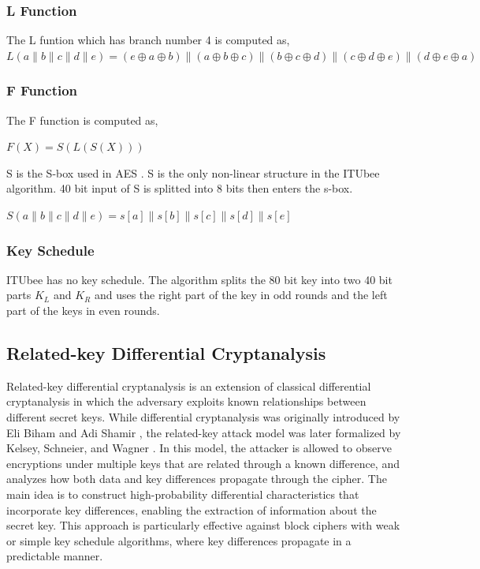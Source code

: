 \subsubsection{L Function}
The L funtion which has branch number 4 is computed as,\\
$L(a \parallel b \parallel c \parallel d \parallel e) = (e \oplus a \oplus b) \parallel (a \oplus b \oplus c) \parallel (b \oplus c \oplus d) \parallel (c \oplus d \oplus e) \parallel (d \oplus e \oplus a)$



\subsubsection{F Function}
The F function is computed as,\\
\begin{center}
    $F (X) = S(L(S(X)))$
\end{center}

S is the S-box used in AES \cite{fips197aes}. S is the only non-linear structure in the ITUbee algorithm.  40 bit input of S is splitted into 8 bits then enters the s-box.
\begin{center}
    $S(a\parallel b \parallel c \parallel d \parallel e) = s[a] \parallel s[b] \parallel s[c] \parallel s[d] \parallel s[e]$ 
\end{center}

\subsubsection{Key Schedule}

ITUbee has no key schedule. The algorithm splits the 80 bit key into two 40 bit parts $K_L$ and $K_R$ and uses the right part of the key in odd rounds and the left part of the keys in even rounds.



\subsection{Related-key Differential Cryptanalysis}

Related-key differential cryptanalysis is an extension of classical differential cryptanalysis in which the adversary exploits known relationships between different secret keys. While differential cryptanalysis was originally introduced by Eli Biham and Adi Shamir \cite{biham1990differential}, the related-key attack model was later formalized by Kelsey, Schneier, and Wagner \cite{kelsey1996related}. In this model, the attacker is allowed to observe encryptions under multiple keys that are related through a known difference, and analyzes how both data and key differences propagate through the cipher. The main idea is to construct high-probability differential characteristics that incorporate key differences, enabling the extraction of information about the secret key. This approach is particularly effective against block ciphers with weak or simple key schedule algorithms, where key differences propagate in a predictable manner.

